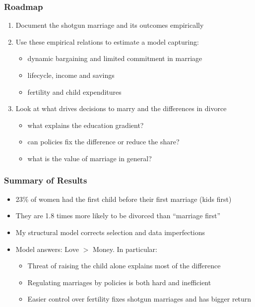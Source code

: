 \documentclass[aspectratio=169]{beamer}
\let\olditem\item
\renewcommand{\item}{%
\olditem\vspace{\fill}}
\begin{document}
\begin{frame}
\frametitle{Roadmap}
\begin{enumerate}
\item Document the shotgun marriage and its outcomes empirically
\item Use these empirical relations to estimate a model capturing:
\begin{itemize}
\item dynamic bargaining and limited commitment in marriage
\item lifecycle, income and savings
\item fertility and child expenditures
\end{itemize}
\item Look at what drives decisions to marry and the differences in divorce
\begin{itemize}
\item what explains the education gradient?
\item can policies fix the difference or reduce the share?
\item what is the value of marriage in general?
\end{itemize}
\end{enumerate}
\end{frame}

\begin{frame}
\frametitle{Summary of Results}
\begin{itemize}
\item 23\% of women had the first child before their first marriage (kids first)
\item They are 1.8 times more likely to be divorced than ``marriage first''
\item My structural model corrects selection and data imperfections
\item Model answers: Love $>$ Money. In particular:
\begin{itemize}
\item Threat of raising the child alone explains most of the difference
\item Regulating marriages by policies is both hard and inefficient
\item Easier control over fertility fixes shotgun marriages and has bigger return
\end{itemize}
\end{itemize}
\end{frame}
\end{document}
